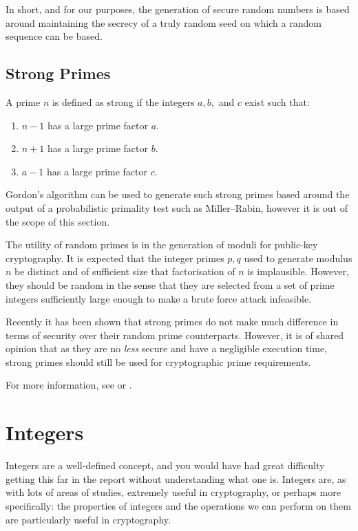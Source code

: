     In short, and for our purposes, the generation of secure random numbers is based around maintaining the secrecy of a truly random seed on which a random sequence can be based.
    
  \subsection{Strong Primes}
  
  A prime $n$ is defined as strong if the integers $a,b,$ and $c$ exist such that:
  
  \begin{enumerate}
    \item $n - 1$ has a large prime factor $a$.
    \item $n + 1$ has a large prime factor $b$.
    \item $a - 1$ has a large prime factor $c$.
  \end{enumerate}
  
  Gordon's algorithm can be used to generate such strong primes based around the output of a probabilistic primality test such as Miller--Rabin, however it is out of the scope of this section.
  
  The utility of random primes is in the generation of moduli for public-key cryptography. It is expected that the integer primes $p,q$ used to generate modulus $n$ be distinct and of sufficient size that factorisation of $n$ is implausible. However, they should be random in the sense that they are selected from a set of prime integers sufficiently large enough to make a brute force attack infeasible.
  
  Recently it has been shown that strong primes do not make much difference in terms of security over their random prime counterparts. However, it is of shared opinion that as they are no \emph{less} secure and have a negligible execution time, strong primes should still be used for cryptographic prime requirements.
  
  For more information, see \cite{Rivest:1999aa} or \cite{Gordon:1985aa}.

\section{Integers}

Integers are a well-defined concept, and you would have had great difficulty getting this far in the report without understanding what one is. Integers are, as with lots of areas of studies, extremely useful in cryptography, or perhaps more specifically: the properties of integers and the operations we can perform on them are particularly useful in cryptography.

